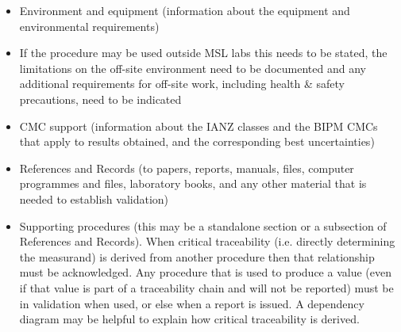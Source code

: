 \begin{itemize}
	\vspace{\baselineskip}
	 \footnote{}
	\item Environment and equipment (information about the equipment and environmental requirements)
	\item If the procedure may be used outside MSL labs this needs to be stated, the limitations on the off-site environment need to be documented and any additional requirements for off-site work, including health \& safety precautions, need to be indicated
	\item CMC support (information about the IANZ classes and the BIPM CMCs that apply to results obtained, and the corresponding best uncertainties)
	\item References and Records (to papers, reports, manuals, files, computer programmes and files, laboratory books, and any other material that is needed to establish validation)
	\item Supporting procedures (this may be a standalone section or a subsection of References and Records). When critical traceability (i.e. directly determining the measurand) is derived from another procedure then that relationship must be acknowledged. Any procedure that is used to produce a value (even if that value is part of a traceability chain and will not be reported) must be in validation when used, or else when a report is issued. A dependency diagram may be helpful to explain how critical traceability is derived.
	
\end{itemize}

